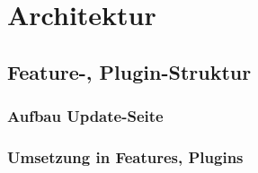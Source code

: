 \section{Architektur}
\subsection{Feature-, Plugin-Struktur}
\subsubsection{Aufbau Update-Seite}


\subsubsection{Umsetzung in Features, Plugins}














